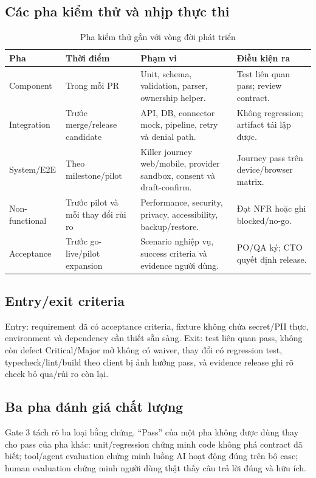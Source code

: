 \documentclass[12pt,a4paper]{article}
\begin{document}
\subsection{Các pha kiểm thử và nhịp thực thi}
\begin{table}[H]
\centering
\caption{Pha kiểm thử gắn với vòng đời phát triển}
\begin{tabularx}{\textwidth}{P{2.5cm}P{3.4cm}Y P{3.7cm}}
\color{white}\textbf{Pha} & \color{white}\textbf{Thời điểm} &
\color{white}\textbf{Phạm vi} & \color{white}\textbf{Điều kiện ra}\\
\toprule
Component & Trong mỗi PR & Unit, schema, validation, parser, ownership helper. &
Test liên quan pass; review contract.\\
Integration & Trước merge/release candidate & API, DB, connector mock, pipeline,
retry và denial path. & Không regression; artifact tái lập được.\\
System/E2E & Theo milestone/pilot & Killer journey web/mobile, provider sandbox,
consent và draft-confirm. & Journey pass trên device/browser matrix.\\
Non-functional & Trước pilot và mỗi thay đổi rủi ro & Performance, security,
privacy, accessibility, backup/restore. & Đạt NFR hoặc ghi blocked/no-go.\\
Acceptance & Trước go-live/pilot expansion & Scenario nghiệp vụ, success criteria
và evidence người dùng. & PO/QA ký; CTO quyết định release.\\
\bottomrule
\end{tabularx}
\end{table}

\subsection{Entry/exit criteria}
Entry: requirement đã có acceptance criteria, fixture không chứa secret/PII thực, environment và dependency cần thiết sẵn sàng. Exit: test liên quan pass, không còn defect Critical/Major mở không có waiver, thay đổi có regression test, typecheck/lint/build theo client bị ảnh hưởng pass, và evidence release ghi rõ check bỏ qua/rủi ro còn lại.

\subsection{Ba pha đánh giá chất lượng}
Gate 3 tách rõ ba loại bằng chứng. ``Pass'' của một pha không được dùng thay
cho pass của pha khác: unit/regression chứng minh code không phá contract đã
biết; tool/agent evaluation chứng minh luồng AI hoạt động đúng trên bộ case;
human evaluation chứng minh người dùng thật thấy câu trả lời đúng và hữu ích.
\end{document}
